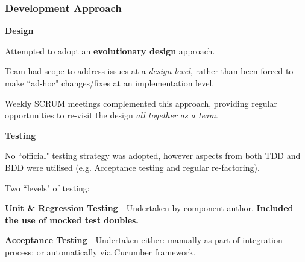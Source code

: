 \documentclass[10pt, compress]{beamer}
\begin{document}
\begin{frame}[fragile]
  \frametitle{Development Approach}
  
   \small{ 
   
       	 \textbf{Design}
   
   \begin{itemize}
  			\footnotesize{
  			\item Attempted to adopt an \textbf{evolutionary design} approach.
  			\item Team had scope to address issues at a \textit{design level}, rather than been forced to make ``ad-hoc" changes/fixes at an implementation level.
  			\item Weekly SCRUM meetings complemented this approach, providing regular opportunities to re-visit the design \textit{all together as a team}.
  			}
  		\end{itemize}
  		
   \textbf{Testing}
   
   \begin{itemize}
  			\footnotesize{
  			\item No ``official" testing strategy was adopted, however aspects from both TDD and BDD were utilised (e.g. Acceptance testing and regular re-factoring).
  			\item Two ``levels" of testing:
  			
  			\begin{enumerate}
  			\footnotesize{
  				\item \textbf{Unit \& Regression Testing} - Undertaken by  component author. \textbf{Included the use of mocked test doubles.}
  				\item \textbf{Acceptance Testing} - Undertaken either: manually as part of integration process; or automatically via Cucumber framework.
  				}
  			\end{enumerate}
  			
  				}
  		\end{itemize}
  		

   }
   
\end{frame}
\end{document}

